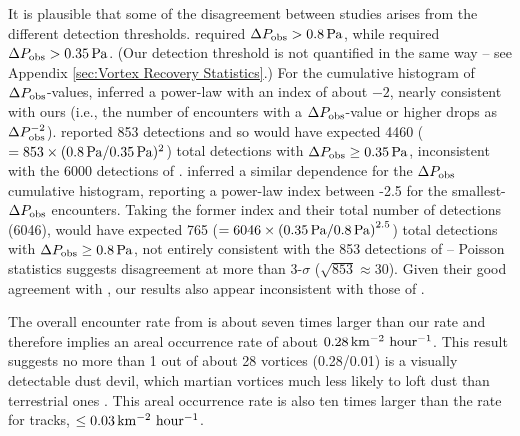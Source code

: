 \documentclass[linenumbers,trackchanges]{aastex63}
\begin{document}
It is plausible that some of the disagreement between studies arises from the different detection thresholds. \citet{2021Icar..35514119L} required $\Delta P_{\rm obs} > 0.8\,{\rm Pa}$, while \citet{Spiga2021} required $\Delta P_{\rm obs} > 0.35\,{\rm Pa}$. (Our detection threshold is not quantified in the same way -- see Appendix \ref{sec:Vortex Recovery Statistics}.) For the cumulative histogram of $\Delta P_{\rm obs}$-values, \citet{2021Icar..35514119L} inferred a power-law with an index of about $-2$, nearly consistent with ours (i.e., the number of encounters with a $\Delta P_{\rm obs}$-value or higher drops as $\Delta P_{\rm obs}^{-2}$). \citet{2021Icar..35514119L} reported 853 detections and so would have expected 4460 ($= 853 \times (0.8\,{\rm Pa}/0.35\,{\rm Pa})^2$) total detections with $\Delta P_{\rm obs} \geq 0.35\,{\rm Pa}$, inconsistent with the 6000 detections of \citet{Spiga2021}. \citet{Spiga2021} inferred a similar dependence for the $\Delta P_{\rm obs}$ cumulative histogram, reporting a power-law index between -2.5 for the smallest-$\Delta P_{\rm obs}$ encounters. Taking the former index and their total number of detections (6046), \citet{Spiga2021} would have expected 765 ($= 6046 \times \left(0.35\,{\rm Pa}/0.8\,{\rm Pa} \right)^{2.5}$) total detections with $\Delta P_{\rm obs} \geq 0.8\,{\rm Pa}$, not entirely consistent with the 853 detections of \citet{2021Icar..35514119L} -- Poisson statistics suggests disagreement at more than 3-$\sigma$ ($\sqrt{853} \approx 30$). Given their good agreement with \citet{2021Icar..35514119L}, our results also appear inconsistent with those of \citet{Spiga2021}.

The overall encounter rate from \citet{Spiga2021} is about seven times larger than our rate and therefore implies an areal occurrence rate of about $0.28\,{\rm km^{-2}\ hour^{-1}}$. This result suggests no more than 1 out of about 28 vortices (0.28/0.01) is a visually detectable dust devil, which  martian vortices  much less likely to loft dust than terrestrial ones \citep{LORENZ20151}. This areal occurrence rate is also ten times larger than the rate for tracks, $\le 0.03\,{\rm km^{-2}\ hour^{-1}}$.
\end{document}
